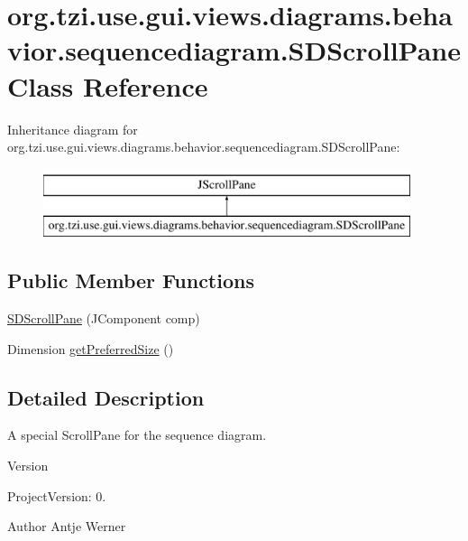 \hypertarget{classorg_1_1tzi_1_1use_1_1gui_1_1views_1_1diagrams_1_1behavior_1_1sequencediagram_1_1_s_d_scroll_pane}{\section{org.\-tzi.\-use.\-gui.\-views.\-diagrams.\-behavior.\-sequencediagram.\-S\-D\-Scroll\-Pane Class Reference}
\label{classorg_1_1tzi_1_1use_1_1gui_1_1views_1_1diagrams_1_1behavior_1_1sequencediagram_1_1_s_d_scroll_pane}
}
Inheritance diagram for org.\-tzi.\-use.\-gui.\-views.\-diagrams.\-behavior.\-sequencediagram.\-S\-D\-Scroll\-Pane\-:\begin{figure}[H]
\begin{center}
\leavevmode
\includegraphics[height=2.000000cm]{classorg_1_1tzi_1_1use_1_1gui_1_1views_1_1diagrams_1_1behavior_1_1sequencediagram_1_1_s_d_scroll_pane}
\end{center}
\end{figure}
\subsection*{Public Member Functions}
\begin{DoxyCompactItemize}
\item 
\hyperlink{classorg_1_1tzi_1_1use_1_1gui_1_1views_1_1diagrams_1_1behavior_1_1sequencediagram_1_1_s_d_scroll_pane_acc5791b67fd0ebe118baa71cf5f53f4e}{S\-D\-Scroll\-Pane} (J\-Component comp)
\item 
Dimension \hyperlink{classorg_1_1tzi_1_1use_1_1gui_1_1views_1_1diagrams_1_1behavior_1_1sequencediagram_1_1_s_d_scroll_pane_a92327fcdf8db097147be254ec0e1de43}{get\-Preferred\-Size} ()
\end{DoxyCompactItemize}


\subsection{Detailed Description}
A special Scroll\-Pane for the sequence diagram.

\begin{DoxyVersion}{Version}

\end{DoxyVersion}
\begin{DoxyParagraph}{Project\-Version\-:}
0. 
\end{DoxyParagraph}
\begin{DoxyAuthor}{Author}
Antje Werner 
\end{DoxyAuthor}



